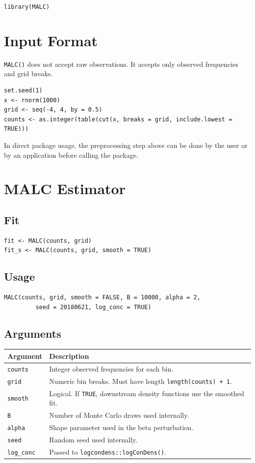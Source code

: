 \documentclass[11pt]{article}
\begin{document}
\begin{lstlisting}
library(MALC)
\end{lstlisting}

\section{Input Format}

\texttt{MALC()} does not accept raw observations. It accepts only observed
frequencies and grid breaks.

\begin{lstlisting}
set.seed(1)
x <- rnorm(1000)
grid <- seq(-4, 4, by = 0.5)
counts <- as.integer(table(cut(x, breaks = grid, include.lowest = TRUE)))
\end{lstlisting}

In direct package usage, the preprocessing step above can be done by the user
or by an application before calling the package.

\section{MALC Estimator}

\subsection{Fit}

\begin{lstlisting}
fit <- MALC(counts, grid)
fit_s <- MALC(counts, grid, smooth = TRUE)
\end{lstlisting}

\subsection*{Usage}

\begin{lstlisting}
MALC(counts, grid, smooth = FALSE, B = 10000, alpha = 2,
         seed = 20180621, log_conc = TRUE)
\end{lstlisting}

\subsection*{Arguments}

\begin{tabular}{ll}
\toprule
Argument & Description \\
\midrule
\texttt{counts} & Integer observed frequencies for each bin. \\
\texttt{grid} & Numeric bin breaks. Must have length \texttt{length(counts) + 1}. \\
\texttt{smooth} & Logical. If \texttt{TRUE}, downstream density functions use the smoothed fit. \\
\texttt{B} & Number of Monte Carlo draws used internally. \\
\texttt{alpha} & Shape parameter used in the beta perturbation. \\
\texttt{seed} & Random seed used internally. \\
\texttt{log\_conc} & Passed to \texttt{logcondens::logConDens()}. \\
\bottomrule
\end{tabular}
\end{document}
